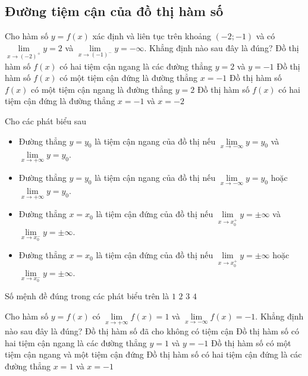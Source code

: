 \subsection{Đường tiệm cận của đồ thị hàm số}


\begin{ex}%
	Cho hàm số $y=f(x)$ xác định và liên tục trên khoảng $(-2;-1)$ và có
	$\lim\limits_{x\rightarrow (-2)^{+}}y=2$ và $\lim\limits_{x\rightarrow (-1)^{-}}y=-\infty$. Khẳng định nào sau đây là đúng?
	\choice
	{Đồ thị hàm số $f(x)$ có hai tiệm cận ngang là các đường thẳng $y=2$ và $y=-1$}
	{\True Đồ thị hàm số $f(x)$ có một tiệm cận đứng là đường thẳng $x=-1$}
	{Đồ thị hàm số $f(x)$ có một tiệm cận ngang là đường thẳng $y=2$}
	{Đồ thị hàm số $f(x)$ có hai tiệm cận đứng là đường thẳng $x=-1$ và $x=-2$}
\end{ex}
\begin{ex}%
	Cho các phát biểu sau
	\begin{itemize}
		\item Đường thẳng $y=y_0$ là tiệm cận ngang của đồ thị nếu 
		$\lim\limits_{x\rightarrow -\infty}y=y_0$ và $\lim\limits_{x\rightarrow +\infty}y=y_0$.
		\item Đường thẳng $y=y_0$ là tiệm cận ngang của đồ thị nếu $\lim\limits_{x\rightarrow -\infty}y=y_0$ hoặc $\lim\limits_{x\rightarrow +\infty}y=y_0$.
		\item Đường thẳng $x=x_0$ là tiệm cận đứng của đồ thị nếu 
		$\lim\limits_{x\rightarrow x_0^+}y=\pm\infty$ và $\lim\limits_{x\rightarrow x_0^-}y=\pm\infty$.
		\item Đường thẳng $x=x_0$ là tiệm cận đứng của đồ thị nếu $\lim\limits_{x\rightarrow x_0^+}y=\pm\infty$ hoặc $\lim\limits_{x\rightarrow x_0^-}y=\pm\infty$.
	\end{itemize}
	Số mệnh đề đúng trong các phát biểu trên là 
	\choice
	{$1$}
	{\True $2$}
	{$3$}
	{$4$}
\end{ex}
\begin{ex}%
	Cho hàm số $y=f(x)$ có $\lim\limits_{x\rightarrow +\infty}f(x)=1$ và $\lim\limits_{x\rightarrow -\infty}f(x)=-1$. Khẳng định nào sau đây là đúng?
	\choice
	{Đồ thị hàm số đã cho không có tiệm cận}
	{\True Đồ thị hàm số có hai tiệm cận ngang là các đường thẳng $y=1$ và $y=-1$}
	{Đồ thị hàm số có một tiệm cận ngang và một tiệm cận đứng}
	{Đồ thị hàm số có hai tiệm cận đứng là các đường thẳng $x=1$ và $x=-1$}
\end{ex} 
